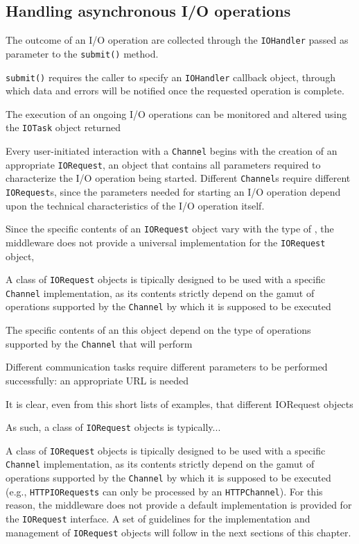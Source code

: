 \subsection{Handling asynchronous I/O operations}


The outcome of an I/O operation are collected through the \texttt{IOHandler} passed as parameter to the \texttt{submit()} method. 

\texttt{submit()} requires the caller to specify an \texttt{IOHandler} callback object, through which data and errors will be notified once the requested operation is complete.

The execution of an ongoing I/O operations can be monitored and altered using the \texttt{IOTask} object returned 






Every user-initiated interaction with a \texttt{Channel} begins with the creation of an appropriate \texttt{IORequest}, an object that contains all parameters required to characterize the I/O operation being started. Different \texttt{Channel}s require different \texttt{IORequest}s, since the parameters needed for starting an I/O operation depend upon the technical characteristics of the I/O operation itself.

Since the specific contents of an \texttt{IORequest} object vary with the type of , the middleware does not provide a universal implementation for the \texttt{IORequest} object, 


A class of \texttt{IORequest} objects is tipically designed to be used with a specific \texttt{Channel} implementation, as its contents strictly depend on the gamut of operations supported by the \texttt{Channel} by which it is supposed to be executed 

The specific contents of an this object depend on the type of operations supported by the \texttt{Channel} that will perform

Different communication tasks require different parameters to be performed successfully: an appropriate URL is needed 

It is clear, even from this short lists of examples, that different IORequest objects

As such, a class of \texttt{IORequest} objects is typically...

 A class of \texttt{IORequest} objects is tipically designed to be used with a specific \texttt{Channel} implementation, as its contents strictly depend on the gamut of operations supported by the \texttt{Channel} by which it is supposed to be executed (e.g., \texttt{HTTPIORequests} can only be processed by an \texttt{HTTPChannel}). For this reason, the middleware does not provide a default implementation is provided for the \texttt{IORequest} interface. A set of guidelines for the implementation and management of \texttt{IORequest} objects will follow in the next sections of this chapter.

